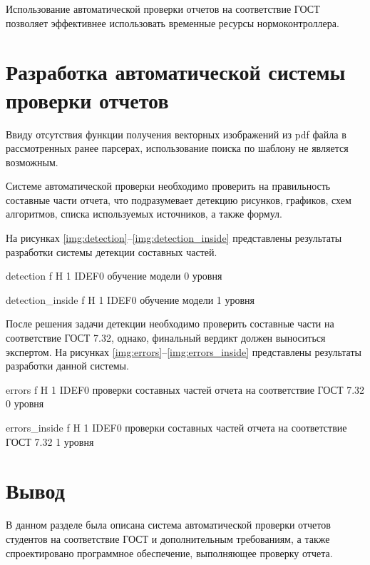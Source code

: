 Использование автоматической проверки отчетов на соответствие ГОСТ позволяет эффективнее использовать временные ресурсы нормоконтроллера.

\section{Разработка автоматической системы проверки отчетов}
Ввиду отсутствия функции получения векторных изображений из pdf файла в рассмотренных ранее парсерах, использование поиска по шаблону не является возможным.

Системе автоматической проверки необходимо проверить на правильность составные части отчета, что подразумевает детекцию рисунков, графиков, схем алгоритмов, списка используемых источников, а также формул.

На рисунках \ref{img:detection}--\ref{img:detection_inside} представлены результаты разработки системы детекции составных частей.

{detection} %
{f} %
{H} %
{1\textwidth} %
{IDEF0 обучение модели 0 уровня} %

{detection_inside} %
{f} %
{H} %
{1\textwidth} %
{IDEF0 обучение модели 1 уровня} %

После решения задачи детекции необходимо проверить составные части на соответствие ГОСТ 7.32, однако, финальный вердикт должен выноситься экспертом. На рисунках \ref{img:errors}--\ref{img:errors_inside} представлены результаты разработки данной системы.

{errors} %
{f} %
{H} %
{1\textwidth} %
{IDEF0 проверки составных частей отчета на соответствие ГОСТ 7.32 0 уровня} %

{errors_inside} %
{f} %
{H} %
{1\textwidth} %
{IDEF0 проверки составных частей отчета на соответствие ГОСТ 7.32 1 уровня} %

\section*{Вывод}
В данном разделе была описана система автоматической проверки отчетов студентов на соответствие ГОСТ и дополнительным требованиям, а также спроектировано программное обеспечение, выполняющее проверку отчета.
